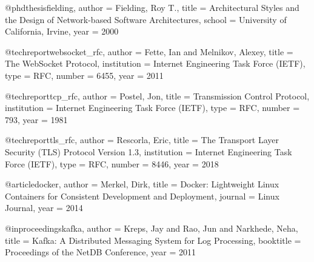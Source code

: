 @phdthesis{fielding,
  author  = {Fielding, Roy T.},
  title   = {Architectural Styles and the Design of Network-based Software Architectures},
  school  = {University of California, Irvine},
  year    = {2000}
}

@techreport{websocket_rfc,
  author      = {Fette, Ian and Melnikov, Alexey},
  title       = {The WebSocket Protocol},
  institution = {Internet Engineering Task Force (IETF)},
  type        = {RFC},
  number      = {6455},
  year        = {2011}
}

@techreport{tcp_rfc,
  author      = {Postel, Jon},
  title       = {Transmission Control Protocol},
  institution = {Internet Engineering Task Force (IETF)},
  type        = {RFC},
  number      = {793},
  year        = {1981}
}

@techreport{tls_rfc,
  author      = {Rescorla, Eric},
  title       = {The Transport Layer Security (TLS) Protocol Version 1.3},
  institution = {Internet Engineering Task Force (IETF)},
  type        = {RFC},
  number      = {8446},
  year        = {2018}
}

@article{docker,
  author  = {Merkel, Dirk},
  title   = {Docker: Lightweight Linux Containers for Consistent Development and Deployment},
  journal = {Linux Journal},
  year    = {2014}
}

@inproceedings{kafka,
  author    = {Kreps, Jay and Rao, Jun and Narkhede, Neha},
  title     = {Kafka: A Distributed Messaging System for Log Processing},
  booktitle = {Proceedings of the NetDB Conference},
  year      = {2011}
}